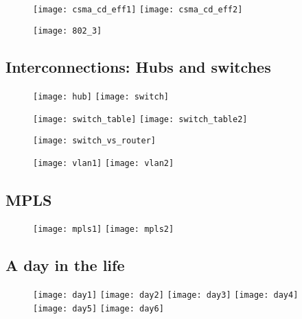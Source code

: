 \begin{figure}[H]
  \centering
  \texttt{[image: csma\_cd\_eff1]}
  \texttt{[image: csma\_cd\_eff2]}
\end{figure}

\begin{figure}[H]
  \centering
  \texttt{[image: 802\_3]}
\end{figure}

\subsection{Interconnections: Hubs and switches}

\begin{figure}[H]
  \centering
  \texttt{[image: hub]}
  \texttt{[image: switch]}
\end{figure}

\begin{figure}[H]
  \centering
  \texttt{[image: switch\_table]}
  \texttt{[image: switch\_table2]}
\end{figure}

\begin{figure}[H]
  \centering
  \texttt{[image: switch\_vs\_router]}
\end{figure}

\begin{figure}[H]
  \centering
  \texttt{[image: vlan1]}
  \texttt{[image: vlan2]}
\end{figure}

\subsection{MPLS}

\begin{figure}[H]
  \centering
  \texttt{[image: mpls1]}
  \texttt{[image: mpls2]}
\end{figure}

\subsection{A day in the life}
\begin{figure}[H]
  \centering
  \texttt{[image: day1]}
  \texttt{[image: day2]}
  \texttt{[image: day3]}
  \texttt{[image: day4]}
  \texttt{[image: day5]}
  \texttt{[image: day6]}
\end{figure}
